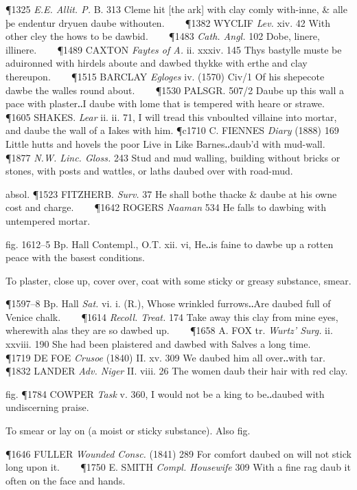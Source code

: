 \begin{description}[wide, labelwidth=!, labelindent=0pt]
\begin{myenumerate}
\P 1325  \textit{E.E. Allit. P.} B. 313 Cleme hit [the ark] with clay comly with-inne, \& alle þe endentur dryuen daube withouten.    
\P 1382 WYCLIF  \textit{Lev.} xiv. 42 With other cley the hows to be dawbid.    
\P 1483 \textit{Cath.  Angl.} 102 Dobe, linere, illinere.    
\P 1489 CAXTON  \textit{Faytes of A.} ii. xxxiv. 145 Thys bastylle muste be aduironned with hirdels aboute and dawbed thykke with erthe and clay thereupon.    
\P 1515 BARCLAY  \textit{Egloges} iv. (1570) Civ/1 Of his shepecote dawbe the walles round about.    
\P 1530 PALSGR. 507/2 Daube up this wall a pace with plaster‥I daube with lome that is tempered with heare or strawe.    
\P 1605 SHAKES.  \textit{Lear} ii. ii. 71, I will tread this vnboulted villaine into mortar, and daube the wall of a Iakes with him.
\P c1710 C. FIENNES  \textit{Diary} (1888) 169 Little hutts and hovels the poor Live in Like Barnes‥daub'd with mud-wall.    
\P 1877 \textit{N.W. Linc. Gloss.} 243 Stud and mud walling, building without bricks or stones, with posts and wattles, or laths daubed over with road-mud.

absol. \P 1523 FITZHERB.  \textit{Surv.} 37 He shall bothe thacke \& daube at his owne cost and charge.    
\P 1642 ROGERS  \textit{Naaman} 534 He falls to dawbing with untempered mortar.

fig. 1612–5 Bp. Hall Contempl., O.T. xii. vi, He‥is faine to dawbe up a rotten peace with the basest conditions.

 To plaster, close up, cover over, coat with some sticky or greasy substance, smear.

\P 1597–8 Bp. Hall \textit{Sat.} vi. i. (R.), Whose wrinkled furrows‥Are daubed full of Venice chalk.    
\P 1614 \textit{Recoll. Treat.} 174 Take away this clay from mine eyes, wherewith alas they are so dawbed up.    
\P 1658 A. FOX tr. \textit{Wurtz' Surg.} ii. xxviii. 190 She had been plaistered and dawbed with Salves a long time.    
\P 1719 DE FOE  \textit{Crusoe} (1840) II. xv. 309 We daubed him all over‥with tar.    
\P 1832 LANDER  \textit{Adv. Niger} II. viii. 26 The women daub their hair with red clay.

fig. \P 1784 COWPER  \textit{Task} v. 360, I would not be a king to be‥daubed with undiscerning praise.

 To smear or lay on (a moist or sticky substance). Also fig.

\P 1646 FULLER  \textit{Wounded Consc.} (1841) 289 For comfort daubed on will not stick long upon it.    
\P 1750 E. SMITH  \textit{Compl. Housewife} 309 With a fine rag daub it often on the face and hands.


\end{myenumerate}
\end{description}
